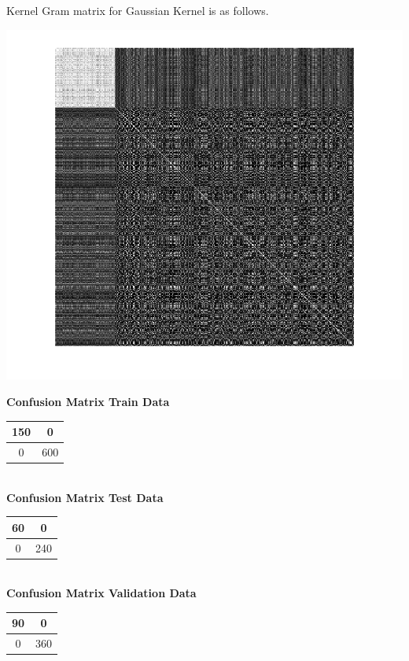\documentclass{article}
\begin{document}
Kernel Gram matrix for Gaussian Kernel is as follows.
\begin{center}
\includegraphics[scale=1]{Classification/1b/nu_g/kgm}
\end{center}


\begin{flushleft}
\textbf{Confusion Matrix Train Data\\[5pt]}
\begin{tabular}{|c|c|}
\hline
150 & 0 \\
\hline
0 & 600\\
\hline
\end{tabular}
\textbf{\\[10pt] Confusion Matrix Test Data \\[5pt]}
\begin{tabular}{|c|c|}
\hline
60 & 0 \\
\hline
0 & 240\\
\hline
\end{tabular}
\textbf{\\[10pt] Confusion Matrix Validation Data \\[5pt]}
\begin{tabular}{|c|c|}
\hline
90 & 0 \\
\hline
0 & 360\\
\hline
\end{tabular}
\end{flushleft}
\end{document}
